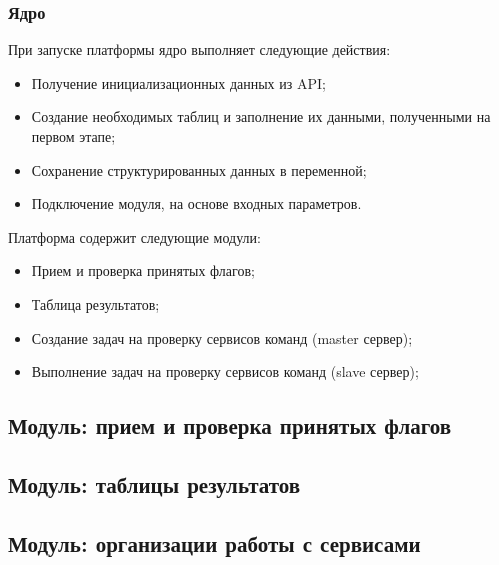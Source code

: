 \subsubsection{Ядро}

При запуске платформы ядро выполняет следующие действия:
\begin{itemize} 
\item Получение инициализационных данных из API;
\item Создание необходимых таблиц и заполнение их данными, полученными на первом этапе; 
\item Сохранение структурированных данных в переменной;
\item Подключение модуля, на основе входных параметров.
\end{itemize}


Платформа содержит следующие модули:
\begin{itemize} 
\item Прием и проверка принятых флагов;
\item Таблица результатов; 
\item Создание задач на проверку сервисов команд (master сервер);
\item Выполнение задач на проверку сервисов команд (slave сервер);
\end{itemize}


\subsection{Модуль: прием и проверка принятых флагов} %


\subsection{Модуль: таблицы результатов} %


\subsection{Модуль: организации работы с сервисами} %

